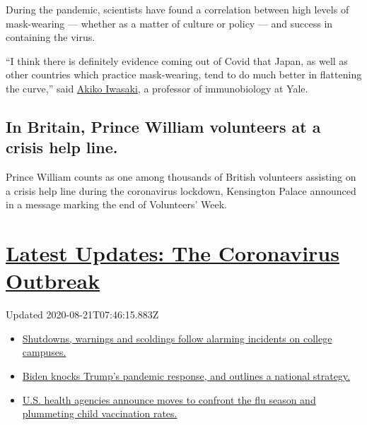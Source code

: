During the pandemic, scientists have found a correlation between high
levels of mask-wearing --- whether as a matter of culture or policy ---
and success in containing the virus.

``I think there is definitely evidence coming out of Covid that Japan,
as well as other countries which practice mask-wearing, tend to do much
better in flattening the curve,'' said
\href{https://medicine.yale.edu/profile/akiko_iwasaki/}{Akiko Iwasaki},
a professor of immunobiology at Yale.

\hypertarget{in-britain-prince-william-volunteers-at-a-crisis-help-line}{%
\subsection{In Britain, Prince William volunteers at a crisis help
line.}\label{in-britain-prince-william-volunteers-at-a-crisis-help-line}}

Prince William counts as one among thousands of British volunteers
assisting on a crisis help line during the coronavirus lockdown,
Kensington Palace announced in a message marking the end of Volunteers'
Week.

\hypertarget{latest-updates-the-coronavirus-outbreak}{%
\section{\texorpdfstring{\href{https://www.nytimes3xbfgragh.onion/2020/08/20/world/coronavirus-covid.html?action=click\&pgtype=Article\&state=default\&region=MAIN_CONTENT_1\&context=storylines_live_updates}{Latest
Updates: The Coronavirus
Outbreak}}{Latest Updates: The Coronavirus Outbreak}}\label{latest-updates-the-coronavirus-outbreak}}

Updated 2020-08-21T07:46:15.883Z

\begin{itemize}
\tightlist
\item
  \href{https://www.nytimes3xbfgragh.onion/2020/08/20/world/coronavirus-covid.html?action=click\&pgtype=Article\&state=default\&region=MAIN_CONTENT_1\&context=storylines_live_updates\#link-68774d88}{Shutdowns,
  warnings and scoldings follow alarming incidents on college campuses.}
\item
  \href{https://www.nytimes3xbfgragh.onion/2020/08/20/world/coronavirus-covid.html?action=click\&pgtype=Article\&state=default\&region=MAIN_CONTENT_1\&context=storylines_live_updates\#link-26b58724}{Biden
  knocks Trump's pandemic response, and outlines a national strategy.}
\item
  \href{https://www.nytimes3xbfgragh.onion/2020/08/20/world/coronavirus-covid.html?action=click\&pgtype=Article\&state=default\&region=MAIN_CONTENT_1\&context=storylines_live_updates\#link-4e542da3}{U.S.
  health agencies announce moves to confront the flu season and
  plummeting child vaccination rates.}
\end{itemize}

